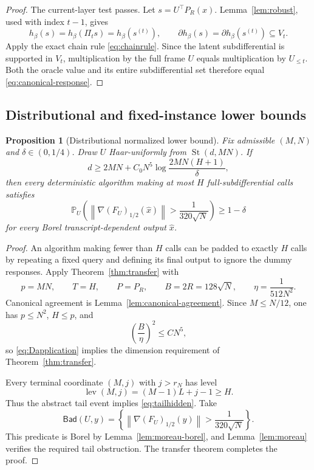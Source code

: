 \documentclass[11pt,a4paper]{article}
\newcommand{\Prob}{\mathbb{P}}
\newcommand{\norm}[1]{\left\lVert #1\right\rVert}
\DeclareMathOperator{\lev}{lev}
\newtheorem{proposition}[theorem]{Proposition}
\theoremstyle{definition}
\numberwithin{equation}{section}
\newcommand{\St}{\operatorname{St}}
\begin{document}
\begin{proof}
The current-layer test passes.  Let $s=U^\top P_R(x)$.  Lemma~\ref{lem:robust}, used with index $t-1$, gives
\[
 h_\beta(s)=h_\beta(\Pi_t s)=h_\beta(s^{(t)}),
 \qquad
 \partial h_\beta(s)=\partial h_\beta(s^{(t)})\subseteq V_t.
\]
Apply the exact chain rule \eqref{eq:chainrule}.  Since the latent subdifferential is supported in $V_t$, multiplication by the full frame $U$ equals multiplication by $U_{\le t}$.  Both the oracle value and its entire subdifferential set therefore equal \eqref{eq:canonical-response}.
\end{proof}

\subsection{Distributional and fixed-instance lower bounds}

\begin{proposition}[Distributional normalized lower bound]\label{prop:distlower}
Fix admissible $(M,N)$ and $\delta\in(0,1/4)$.  Draw $U$ Haar-uniformly from $\St(d,MN)$.  If
\begin{equation}\label{eq:Dapplication}
 d\ge2MN+C_0N^5\log\frac{2MN(H+1)}{\delta},
\end{equation}
then every deterministic algorithm making at most $H$ full-subdifferential calls satisfies
\[
 \Prob_U\!\left(
 \norm{\nabla(F_U)_{1/2}(\widehat x)}
 >\frac1{320\sqrt N}
 \right)\ge1-\delta
\]
for every Borel transcript-dependent output $\widehat x$.
\end{proposition}

\begin{proof}
An algorithm making fewer than $H$ calls can be padded to exactly $H$ calls by repeating a fixed query and defining its final output to ignore the dummy responses.  Apply Theorem~\ref{thm:transfer} with
\[
 p=MN,
 \qquad
 T=H,
 \qquad
 P=P_R,
 \qquad
 B=2R=128\sqrt N,
 \qquad
 \eta=\frac1{512N^2}.
\]
Canonical agreement is Lemma~\ref{lem:canonical-agreement}.  Since $M\le N/12$, one has $p\le N^2$, $H\le p$, and
\[
 \left(\frac B\eta\right)^2\le C N^5,
\]
so \eqref{eq:Dapplication} implies the dimension requirement of Theorem~\ref{thm:transfer}.

Every terminal coordinate $(M,j)$ with $j>r_N$ has level
\[
 \lev(M,j)=(M-1)L+j-1\ge H.
\]
Thus the abstract tail event implies \eqref{eq:tailhidden}.  Take
\[
 \mathsf{Bad}(U,y)=
 \left\{\norm{\nabla(F_U)_{1/2}(y)}>\frac1{320\sqrt N}\right\}.
\]
This predicate is Borel by Lemma~\ref{lem:moreau-borel}, and Lemma~\ref{lem:moreau} verifies the required tail obstruction.  The transfer theorem completes the proof.
\end{proof}
\end{document}
